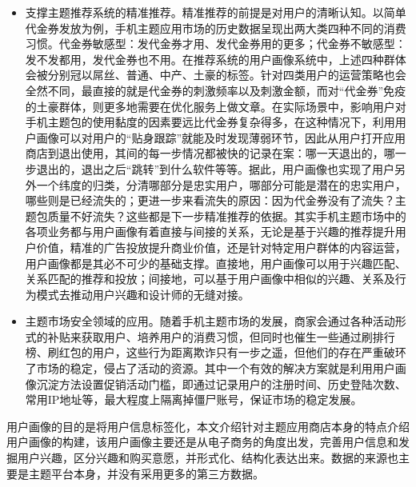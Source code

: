 \begin{itemize}
\item 支撑主题推荐系统的精准推荐。精准推荐的前提是对用户的清晰认知。以简单代金券发放为例，手机主题应用市场的历史数据呈现出两大类四种不同的消费习惯。代金券敏感型：发代金券才用、发代金券用的更多；代金券不敏感型：发不发都用，发代金券也不用。在推荐系统的用户画像系统中，上述四种群体会被分别冠以屌丝、普通、中产、土豪的标签。针对四类用户的运营策略也会全然不同，最直接的就是代金券的刺激频率以及刺激金额，而对“代金券”免疫的土豪群体，则更多地需要在优化服务上做文章。在实际场景中，影响用户对手机主题包的使用黏度的因素要远比代金券复杂得多，在这种情况下，利用用户画像可以对用户的“贴身跟踪”就能及时发现薄弱环节，因此从用户打开应用商店到退出使用，其间的每一步情况都被快的记录在案：哪一天退出的，哪一步退出的，退出之后“跳转”到什么软件等等。据此，用户画像也实现了用户另外一个纬度的归类，分清哪部分是忠实用户，哪部分可能是潜在的忠实用户，哪些则是已经流失的；更进一步来看流失的原因：因为代金券没有了流失？主题包质量不好流失？这些都是下一步精准推荐的依据。其实手机主题市场中的各项业务都与用户画像有着直接与间接的关系，无论是基于兴趣的推荐提升用户价值，精准的广告投放提升商业价值，还是针对特定用户群体的内容运营，用户画像都是其必不可少的基础支撑。直接地，用户画像可以用于兴趣匹配、关系匹配的推荐和投放；间接地，可以基于用户画像中相似的兴趣、关系及行为模式去推动用户兴趣和设计师的无缝对接。
\item 主题市场安全领域的应用。随着手机主题市场的发展，商家会通过各种活动形式的补贴来获取用户、培养用户的消费习惯，但同时也催生一些通过刷排行榜、刷红包的用户，这些行为距离欺诈只有一步之遥，但他们的存在严重破环了市场的稳定，侵占了活动的资源。其中一个有效的解决方案就是利用用户画像沉淀方法设置促销活动门槛，即通过记录用户的注册时间、历史登陆次数、常用IP地址等，最大程度上隔离掉僵尸账号，保证市场的稳定发展。
\end{itemize}

用户画像的目的是将用户信息标签化，本文介绍针对主题应用商店本身的特点介绍用户画像的构建，该用户画像主要还是从电子商务的角度出发，完善用户信息和发掘用户兴趣，区分兴趣和购买意愿，并形式化、结构化表达出来。数据的来源也主要是主题平台本身，并没有采用更多的第三方数据。

